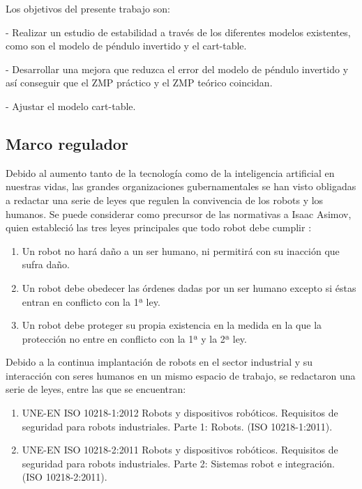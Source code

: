 Los objetivos del presente trabajo son:

- Realizar un estudio de estabilidad a través de los diferentes modelos existentes, como son el modelo de péndulo invertido y el cart-table.

- Desarrollar una mejora que reduzca el error del modelo de péndulo invertido y así conseguir que el ZMP práctico y el ZMP teórico coincidan.

- Ajustar el modelo cart-table.

\subsection{Marco regulador}


Debido al aumento tanto de la tecnología como de la inteligencia artificial en nuestras vidas, las grandes organizaciones gubernamentales se han visto obligadas a redactar una serie de leyes que regulen la convivencia de los robots y los humanos. Se puede considerar como precursor de las normativas a Isaac Asimov, quien estableció las tres leyes principales que todo robot debe cumplir \cite{ref1}:

\begin{enumerate}
\item Un robot no hará daño a un ser humano, ni permitirá con su inacción que sufra daño.
\item Un robot debe obedecer las órdenes dadas por un ser humano excepto si éstas entran en conflicto con la 1ª ley.
\item Un robot debe proteger su propia existencia en la medida en la que la protección no entre en conflicto con la 1ª y la 2ª ley.
\end{enumerate}
%
%

Debido a la continua implantación de robots en el sector industrial y su interacción con seres humanos en un mismo espacio de trabajo, se redactaron una serie de leyes, entre las que se encuentran:
\begin{enumerate}
\item UNE-EN ISO 10218-1:2012 Robots y dispositivos robóticos. Requisitos de seguridad para robots industriales. Parte 1: Robots. (ISO 10218-1:2011).
\item UNE-EN ISO 10218-2:2011 Robots y dispositivos robóticos. Requisitos de seguridad para robots industriales. Parte 2: Sistemas robot e integración. (ISO 10218-2:2011).
\end{enumerate}

